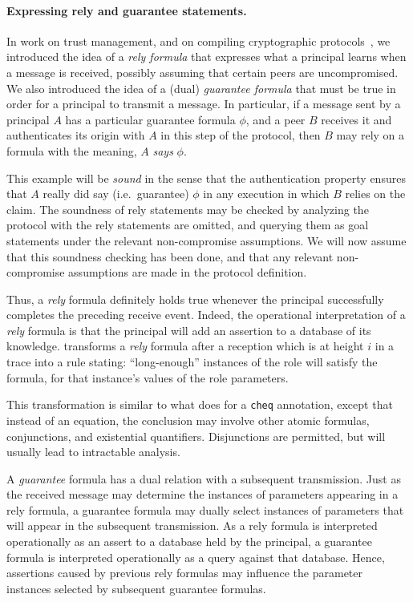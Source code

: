 \paragraph{Expressing rely and guarantee statements.}  In work on
trust management, and on compiling cryptographic
protocols~\cite{GuttmanEtAl04,GuttmanEtAl05,McCarthyEtAl07}, we
introduced the idea of a \emph{rely formula} that expresses what a
principal learns when a message is received, possibly assuming that
certain peers are uncompromised.  We also introduced the idea of a
(dual) \emph{guarantee formula} that must be true in order for a
principal to transmit a message.  In particular, if a message sent by
a principal $A$ has a particular guarantee formula $\phi$, and a peer
$B$ receives it and authenticates its origin with $A$ in this step of
the protocol, then $B$ may rely on a formula with the meaning, $A$
\emph{says} $\phi$.

This example will be \emph{sound} in the sense that the authentication
property ensures that $A$ really did say (i.e.~guarantee) $\phi$ in
any execution in which $B$ relies on the claim.  The soundness of rely
statements may be checked by analyzing the protocol with the rely
statements are omitted, and querying them as goal statements under the
relevant non-compromise assumptions.  We will now assume that this
soundness checking has been done, and that any relevant non-compromise
assumptions are made in the protocol definition.

Thus, a \emph{rely} formula definitely holds true whenever the
principal successfully completes the preceding receive event.  Indeed,
the operational interpretation of a \emph{rely} formula is that the
principal will add an assertion to a database of its knowledge.
{\cpsa} transforms a \emph{rely} formula after a reception which is at
height $i$ in a trace into a rule stating:  ``long-enough'' instances
of the role will satisfy the formula, for that instance's values of
the role parameters.

This transformation is similar to what {\cpsa} does for a \texttt{cheq}
annotation, except that instead of an equation, the conclusion may
involve other atomic formulas, conjunctions, and existential
quantifiers.  Disjunctions are permitted, but will usually lead to
intractable {\cpsa} analysis.

A \emph{guarantee} formula has a dual relation with a subsequent
transmission.  Just as the received message may determine the
instances of parameters appearing in a rely formula, a guarantee
formula may dually select instances of parameters that will appear in
the subsequent transmission.  As a rely formula is interpreted
operationally as an assert to a database held by the principal, a
guarantee formula is interpreted operationally as a query against that
database.  Hence, assertions caused by previous rely formulas may
influence the parameter instances selected by subsequent guarantee
formulas.


